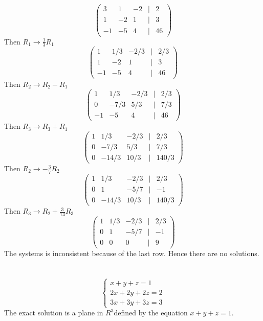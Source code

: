 \documentclass{article}
\begin{document}
\subsection{}
\[\begin{pmatrix}
    3&1&-2&|&2 \\ 1&-2&1&|&3 \\ -1&-5&4&|&46
\end{pmatrix}\]
Then \(R_1 \rightarrow \frac{1}{3}R_1\)
\[\begin{pmatrix}
    1&1/3&-2/3&|&2/3 \\ 1&-2&1&|&3 \\ -1&-5&4&|&46
\end{pmatrix}\]
Then \(R_2 \rightarrow R_2 - R_1\)
\[\begin{pmatrix}
    1&1/3&-2/3&|&2/3 \\ 0&-7/3&5/3&|&7/3 \\ -1&-5&4&|&46
\end{pmatrix}\]
Then \(R_3 \rightarrow R_3+R_1\)
\[\begin{pmatrix}
    1&1/3&-2/3&|&2/3 \\ 0&-7/3&5/3&|&7/3 \\ 0&-14/3&10/3&|&140/3
\end{pmatrix}\]
Then \(R_2 \rightarrow -\frac{3}{7}R_2\)
\[\begin{pmatrix}
    1&1/3&-2/3&|&2/3 \\ 0&1&-5/7&|&-1 \\ 0&-14/3&10/3&|&140/3
\end{pmatrix}\]
Then \(R_3 \rightarrow R_2 + \frac{3}{14}R_3\)
\[\begin{pmatrix}
    1&1/3&-2/3&|&2/3 \\ 0&1&-5/7&|&-1 \\ 0&0&0&|&9
\end{pmatrix}\]
The systems is inconsistent because of the last row. Hence there are no solutions. 
\section{}
\[\begin{cases}
    x+y+z = 1 \\ 2x+2y+2z = 2 \\ 3x+3y+3z=3
\end{cases}\]
The exact solution is a plane in \(R^3\)defined by the equation \(x+y+z = 1\). 
\section{}
\end{document}
